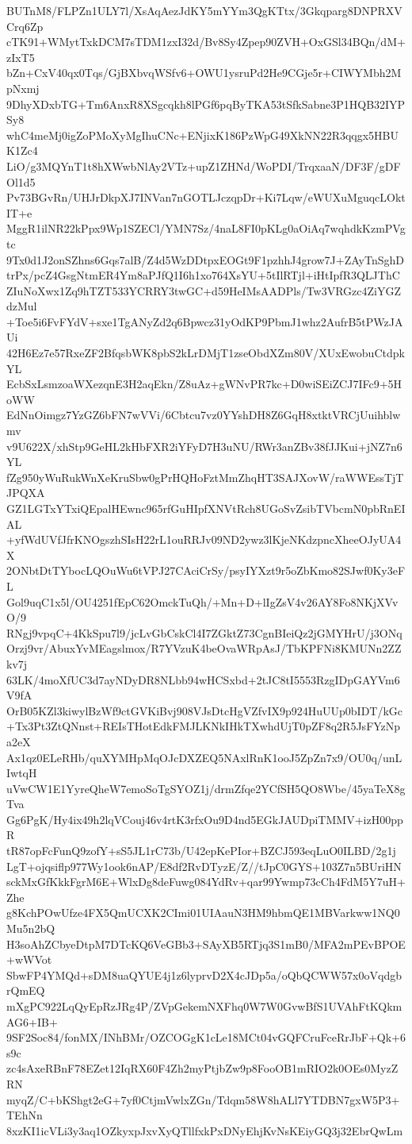 BUTnM8/FLPZn1ULY7l/XsAqAezJdKY5mYYm3QgKTtx/3Gkqparg8DNPRXVCrq6Zp
cTK91+WMytTxkDCM7sTDM1zxI32d/Bv8Sy4Zpep90ZVH+OxGSl34BQn/dM+zIxT5
bZn+CxV40qx0Tqs/GjBXbvqWSfv6+OWU1ysruPd2He9CGje5r+CIWYMbh2MpNxmj
9DhyXDxbTG+Tm6AnxR8XSgcqkh8lPGf6pqByTKA53tSfkSabne3P1HQB32IYPSy8
whC4meMj0igZoPMoXyMgIhuCNc+ENjixK186PzWpG49XkNN22R3qqgx5HBUK1Zc4
LiO/g3MQYnT1t8hXWwbNlAy2VTz+upZ1ZHNd/WoPDI/TrqxaaN/DF3F/gDFOl1d5
Pv73BGvRn/UHJrDkpXJ7INVan7nGOTLJczqpDr+Ki7Lqw/eWUXuMguqcLOktIT+e
MggR1ilNR22kPpx9Wp1SZECl/YMN7Sz/4naL8FI0pKLg0aOiAq7wqhdkKzmPVgtc
9Tx0d1J2onSZhns6Gqs7alB/Z4d5WzDDtpxEOGt9F1pzhhJ4grow7J+ZAyTnSghD
trPx/pcZ4GsgNtmER4Ym8aPJfQ1I6h1xo764XsYU+5tIlRTjl+iHtIpfR3QLJThC
ZIuNoXwx1Zq9hTZT533YCRRY3twGC+d59HeIMsAADPls/Tw3VRGzc4ZiYGZdzMul
+Toe5i6FvFYdV+sxe1TgANyZd2q6Bpwcz31yOdKP9PbmJ1whz2AufrB5tPWzJAUi
42H6Ez7e57RxeZF2BfqsbWK8pbS2kLrDMjT1zseObdXZm80V/XUxEwobuCtdpkYL
EcbSxLsmzoaWXezqnE3H2aqEkn/Z8uAz+gWNvPR7kc+D0wiSEiZCJ7IFc9+5HoWW
EdNnOimgz7YzGZ6bFN7wVVi/6Cbtcu7vz0YYshDH8Z6GqH8xtktVRCjUuihblwmv
v9U622X/xhStp9GeHL2kHbFXR2iYFyD7H3uNU/RWr3anZBv38fJJKui+jNZ7n6YL
fZg950yWuRukWnXeKruSbw0gPrHQHoFztMmZhqHT3SAJXovW/raWWEssTjTJPQXA
GZ1LGTxYTxiQEpalHEwnc965rfGuHIpfXNVtRch8UGoSvZsibTVbcmN0pbRnEIAL
+yfWdUVfJfrKNOgszhSIsH22rL1ouRRJv09ND2ywz3lKjeNKdzpncXheeOJyUA4X
2ONbtDtTYbocLQOuWu6tVPJ27CAciCrSy/psyIYXzt9r5oZbKmo82SJwf0Ky3eFL
Gol9uqC1x5l/OU4251fEpC62OmckTuQh/+Mn+D+lIgZsV4v26AY8Fo8NKjXVvO/9
RNgj9vpqC+4KkSpu7l9/jcLvGbCskCl4I7ZGktZ73CgnBIeiQz2jGMYHrU/j3ONq
Orzj9vr/AbuxYvMEagslmox/R7YVzuK4beOvaWRpAsJ/TbKPFNi8KMUNn2ZZkv7j
63LK/4moXfUC3d7ayNDyDR8NLbb94wHCSxbd+2tJC8tI5553RzgIDpGAYVm6V9fA
OrB05KZl3kiwylBzWf9ctGVKiBvj908VJsDtcHgVZfvIX9p924HuUUp0bIDT/kGc
+Tx3Pt3ZtQNnst+REIsTHotEdkFMJLKNkIHkTXwhdUjT0pZF8q2R5JsFYzNpa2eX
Ax1qz0ELeRHb/quXYMHpMqOJcDXZEQ5NAxlRnK1ooJ5ZpZn7x9/OU0q/unLIwtqH
uVwCW1E1YyreQheW7emoSoTgSYOZ1j/drmZfqe2YCfSH5QO8Wbe/45yaTeX8gTva
Gg6PgK/Hy4ix49h2lqVCouj46v4rtK3rfxOu9D4nd5EGkJAUDpiTMMV+izH00ppR
tR87opFcFunQ9zofY+sS5JL1rC73b/U42epKePIor+BZCJ593eqLuO0ILBD/2g1j
LgT+ojqsiflp977Wy1ook6nAP/E8df2RvDTyzE/Z//tJpC0GYS+103Z7n5BUriHN
sckMxGfKkkFgrM6E+WlxDg8deFuwg084YdRv+qar99Ywmp73cCh4FdM5Y7uH+Zhe
g8KchPOwUfze4FX5QmUCXK2CImi01UIAauN3HM9hbmQE1MBVarkww1NQ0Mu5n2bQ
H3soAhZCbyeDtpM7DTcKQ6VeGBb3+SAyXB5RTjq3S1mB0/MFA2mPEvBPOE+wWVot
SbwFP4YMQd+sDM8uaQYUE4j1z6lyprvD2X4cJDp5a/oQbQCWW57x0oVqdgbrQmEQ
mXgPC922LqQyEpRzJRg4P/ZVpGekemNXFhq0W7W0GvwBfS1UVAhFtKQkmAG6+IB+
9SF2Soc84/fonMX/INhBMr/OZCOGgK1cLe18MCt04vGQFCruFceRrJbF+Qk+6s9c
zc4sAxeRBnF78EZet12IqRX60F4Zh2myPtjbZw9p8FooOB1mRIO2k0OEs0MyzZRN
myqZ/C+bKShgt2eG+7yf0CtjmVwlxZGn/Tdqm58W8hALl7YTDBN7gxW5P3+TEhNn
8xzKI1icVLi3y3aq1OZkyxpJxvXyQTllfxkPxDNyEhjKvNsKEiyGQ3j32EbrQwLm
